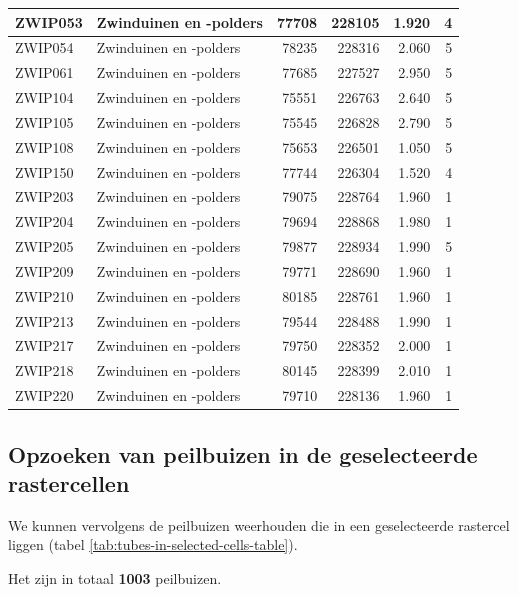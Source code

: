 \documentclass[11pt,]{book}
\begin{document}
\begin{table}
\begin{tabular}[t]{l|l|r|r|r|r}
\hline
ZWIP053 & Zwinduinen en -polders & 77708 & 228105 & 1.920 & 4\\
\hline
ZWIP054 & Zwinduinen en -polders & 78235 & 228316 & 2.060 & 5\\
\hline
ZWIP061 & Zwinduinen en -polders & 77685 & 227527 & 2.950 & 5\\
\hline
ZWIP104 & Zwinduinen en -polders & 75551 & 226763 & 2.640 & 5\\
\hline
ZWIP105 & Zwinduinen en -polders & 75545 & 226828 & 2.790 & 5\\
\hline
ZWIP108 & Zwinduinen en -polders & 75653 & 226501 & 1.050 & 5\\
\hline
ZWIP150 & Zwinduinen en -polders & 77744 & 226304 & 1.520 & 4\\
\hline
ZWIP203 & Zwinduinen en -polders & 79075 & 228764 & 1.960 & 1\\
\hline
ZWIP204 & Zwinduinen en -polders & 79694 & 228868 & 1.980 & 1\\
\hline
ZWIP205 & Zwinduinen en -polders & 79877 & 228934 & 1.990 & 5\\
\hline
ZWIP209 & Zwinduinen en -polders & 79771 & 228690 & 1.960 & 1\\
\hline
ZWIP210 & Zwinduinen en -polders & 80185 & 228761 & 1.960 & 1\\
\hline
ZWIP213 & Zwinduinen en -polders & 79544 & 228488 & 1.990 & 1\\
\hline
ZWIP217 & Zwinduinen en -polders & 79750 & 228352 & 2.000 & 1\\
\hline
ZWIP218 & Zwinduinen en -polders & 80145 & 228399 & 2.010 & 1\\
\hline
ZWIP220 & Zwinduinen en -polders & 79710 & 228136 & 1.960 & 1\\
\hline
\end{tabular}
\end{table}

\subsection{Opzoeken van peilbuizen in de geselecteerde
rastercellen}\label{opzoeken-van-peilbuizen-in-de-geselecteerde-rastercellen}

We kunnen vervolgens de peilbuizen weerhouden die in een geselecteerde
rastercel liggen (tabel \ref{tab:tubes-in-selected-cells-table}).

Het zijn in totaal \textbf{1003} peilbuizen.
\end{document}
